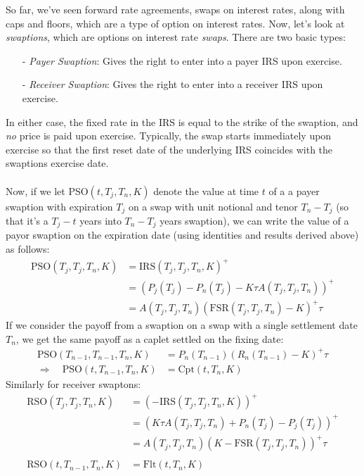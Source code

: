 \documentclass[a4paper,12pt]{scrartcl}
\begin{document}
So far, we've seen forward rate agreements, swaps on interest rates,
along with caps and floors, which are a type of option on interest rates.
Now, let's look at \emph{swaptions}, which are options on 
interest rate \emph{swaps}. There are two basic types:
\begin{itemize}
   \item[-] {\sl Payer Swaption}: Gives the right to enter into a payer
      IRS upon exercise.
   \item[-] {\sl Receiver Swaption}: Gives the right to enter into a 
      receiver IRS upon exercise.
\end{itemize}
In either case, the fixed rate in the IRS is equal to the strike of the
swaption, and \emph{no} price is paid upon exercise. Typically, the
swap starts immediately upon exercise so that the 
first reset date of the underlying IRS coincides with the swaptions
exercise date.
\\
\\
Now, if we let PSO$(t,T_j, T_n, K)$ denote the value at time $t$ 
of a a payer swaption with expiration $T_j$ on a swap with unit notional
and tenor $T_n - T_j$ (so that it's a $T_j -t$ years into $T_n-T_j$
years swaption), we can write the value of a payor swaption on the
expiration date (using identities and results derived above) as follows:
\begin{align*}
   \text{PSO}(T_j,T_j,T_n,K) &= \text{IRS}(T_j, T_j, T_n,K)^+ \\
   &= (P_j(T_j) - P_n(T_j) - K \tau A(T_j, T_j, T_n))^+ \\
   &= A(T_j, T_j, T_n) \left( \text{FSR}(T_j,T_j,T_n) - K\right)^+ \tau
\end{align*}
If we consider the payoff from a swaption on a swap with a single
settlement date $T_n$, we get the same payoff as a caplet settled
on the fixing date:
\begin{align*}
   \text{PSO}(T_{n-1}, T_{n-1},T_n,K) &= P_n(T_{n-1})(R_n(T_{n-1}) - 
      K)^+ \tau \\
      \Rightarrow\quad\text{PSO}(t,T_{n-1},T_n,K) &= \text{Cpt}(t,T_n,K) 
\end{align*}
Similarly for receiver swaptons:
\begin{align*}
   \text{RSO}(T_j,T_j,T_n,K) &= (-\text{IRS}(T_j, T_j, T_n,K))^+ \\
   &= (K \tau A(T_j, T_j, T_n) + P_n(T_j) - P_j(T_j))^+ \\
   &= A(T_j, T_j, T_n) \left( K -  \text{FSR}(T_j,T_j,T_n) 
      \right)^+ \tau\\ \\
   \text{RSO}(t, T_{n-1},T_n,K) &= \text{Flt}(t,T_n,K) 
\end{align*}
\end{document}
